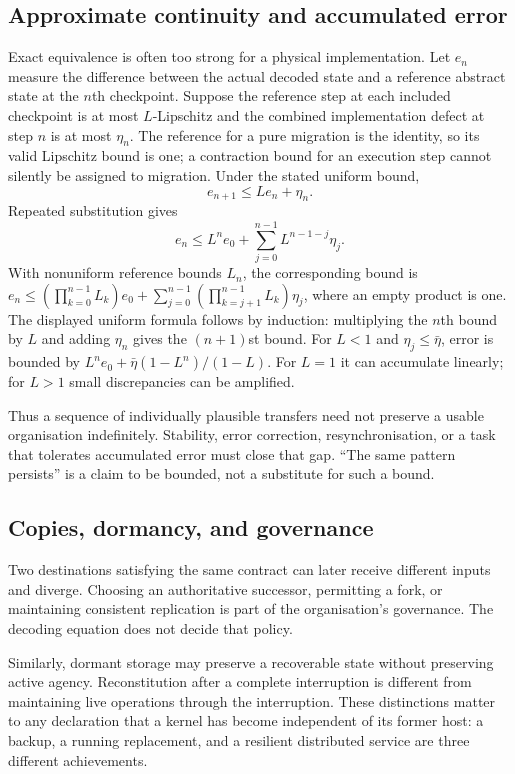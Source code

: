 \documentclass[11pt,a4paper]{article}
\theoremstyle{definition}
\theoremstyle{remark}
\begin{document}
\subsection{Approximate continuity and accumulated error}
Exact equivalence is often too strong for a physical implementation. Let $e_n$ measure the difference between the actual decoded state and a reference abstract state at the $n$th checkpoint. Suppose the reference step at each included checkpoint is at most $L$-Lipschitz and the combined implementation defect at step $n$ is at most $\eta_n$. The reference for a pure migration is the identity, so its valid Lipschitz bound is one; a contraction bound for an execution step cannot silently be assigned to migration. Under the stated uniform bound,
\begin{equation}\label{eq:errorrec}
 e_{n+1}\leq Le_n+\eta_n.
\end{equation}
Repeated substitution gives
\begin{equation}\label{eq:errorbound}
 e_n\leq L^ne_0+\sum_{j=0}^{n-1}L^{n-1-j}\eta_j.
\end{equation}
With nonuniform reference bounds $L_n$, the corresponding bound is $e_n\leq(\prod_{k=0}^{n-1}L_k)e_0+\sum_{j=0}^{n-1}(\prod_{k=j+1}^{n-1}L_k)\eta_j$, where an empty product is one. The displayed uniform formula follows by induction: multiplying the $n$th bound by $L$ and adding $\eta_n$ gives the $(n+1)$st bound. For $L<1$ and $\eta_j\leq\bar\eta$, error is bounded by $L^ne_0+\bar\eta(1-L^n)/(1-L)$. For $L=1$ it can accumulate linearly; for $L>1$ small discrepancies can be amplified.

Thus a sequence of individually plausible transfers need not preserve a usable organisation indefinitely. Stability, error correction, resynchronisation, or a task that tolerates accumulated error must close that gap. ``The same pattern persists'' is a claim to be bounded, not a substitute for such a bound.

\subsection{Copies, dormancy, and governance}
Two destinations satisfying the same contract can later receive different inputs and diverge. Choosing an authoritative successor, permitting a fork, or maintaining consistent replication is part of the organisation's governance. The decoding equation does not decide that policy.

Similarly, dormant storage may preserve a recoverable state without preserving active agency. Reconstitution after a complete interruption is different from maintaining live operations through the interruption. These distinctions matter to any declaration that a kernel has become independent of its former host: a backup, a running replacement, and a resilient distributed service are three different achievements.
\end{document}
